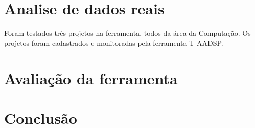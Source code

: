 \documentclass{acm_proc_article-sp}
\begin{document}
\section{Analise de dados reais}
Foram testados três projetos na ferramenta, todos da área da Computação. Os projetos foram cadastrados e monitoradas pela ferramenta T-AADSP.  

\section{Avaliação da ferramenta}


\section{Conclusão}





\end{document}
